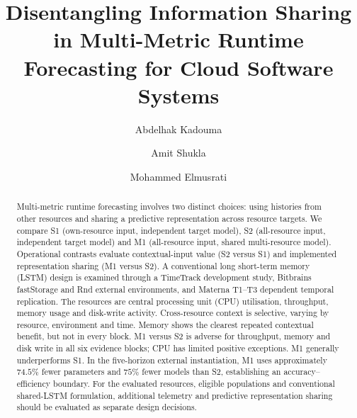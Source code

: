 \documentclass[a4paper,fleqn]{cas-dc}
\begin{document}

\title[mode=title]{Disentangling Information Sharing in Multi-Metric Runtime Forecasting for Cloud Software Systems}

\author[1]{Abdelhak Kadouma}
\cormark[1]

\author[1]{Amit Shukla}

\author[1]{Mohammed Elmusrati}



\begin{abstract}
Multi-metric runtime forecasting involves two distinct choices: using histories
from other resources and sharing a predictive representation across resource
targets. We compare S1 (own-resource input, independent target model), S2
(all-resource input, independent target model) and M1 (all-resource input,
shared multi-resource model). Operational contrasts evaluate contextual-input
value (S2 versus S1) and implemented representation sharing (M1 versus S2).
A conventional long short-term memory (LSTM) design is examined through a
TimeTrack development study, Bitbrains fastStorage and Rnd external
environments, and Materna T1--T3 dependent temporal replication. The resources
are central processing unit (CPU) utilisation, throughput, memory usage and
disk-write activity. Cross-resource context is selective, varying by resource,
environment and time. Memory shows the clearest repeated contextual benefit,
but not in every block. M1 versus S2 is adverse for throughput, memory and
disk write in all six evidence blocks; CPU has limited positive exceptions.
M1 generally underperforms S1. In the five-horizon external instantiation, M1
uses approximately $74.5\%$ fewer parameters and $75\%$ fewer models than S2,
establishing an accuracy--efficiency boundary. For the evaluated resources,
eligible populations and conventional shared-LSTM formulation, additional
telemetry and predictive representation sharing should be evaluated as
separate design decisions.
\end{abstract}
\end{document}
